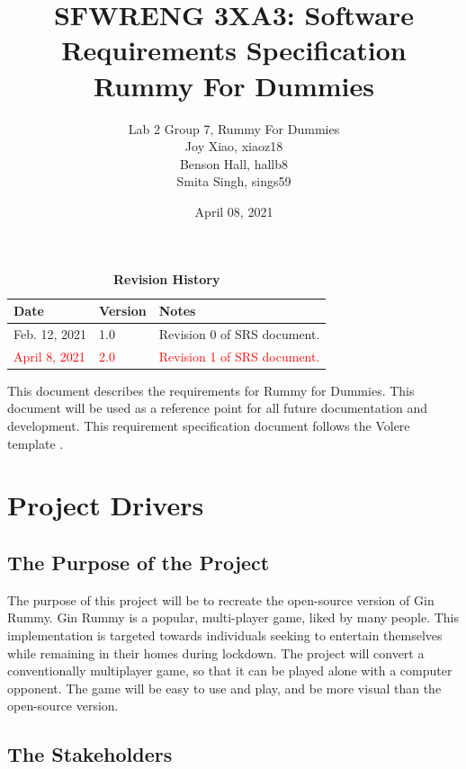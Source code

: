 \documentclass[12pt, titlepage]{article}
\title{SFWRENG 3XA3: Software Requirements Specification\\Rummy For Dummies}
\author{Lab 2 Group 7, Rummy For Dummies
		\\ Joy Xiao, xiaoz18
		\\ Benson Hall, hallb8
		\\ Smita Singh, sings59
}
\date{April 08, 2021}
\begin{document}
\maketitle

\tableofcontents
\listoftables
\listoffigures

\begin{table}[bp]
\caption{\bf Revision History}
\begin{tabularx}{\textwidth}{p{3cm}p{2cm}X}
    \toprule 
    {\bf Date} & {\bf Version} & {\bf Notes} \\
    \midrule
    Feb. 12, 2021 & 1.0 & Revision 0 of SRS document.\\
    \midrule
    \textcolor{red}{April 8, 2021} & \textcolor{red}{2.0} & \textcolor{red}{Revision 1 of SRS document.}\\
    \bottomrule
\end{tabularx}
\end{table}

\newpage


This document describes the requirements for Rummy for Dummies.
This document will be used as a reference point for all future documentation and development. This requirement specification document follows the Volere template \cite{volere}.

\section{Project Drivers}

\subsection{The Purpose of the Project}
The purpose of this project will be to recreate the open-source version of Gin Rummy. Gin Rummy is a popular, multi-player game, liked by many people. This implementation is targeted towards individuals seeking to entertain themselves while remaining in their homes during lockdown. The project will convert a conventionally multiplayer game, so that it can be played alone with a computer opponent. The game will be easy to use and play, and be more visual than the open-source version.

\subsection{The Stakeholders}
\end{document}
